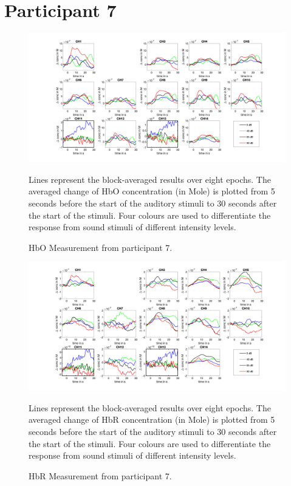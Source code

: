 \section {Participant 7}
\begin{figure}[H]
  \centering
    \includegraphics[scale=.4]{bilder/HbO_Mole/sub_liao_s_HbO.png}
  \caption{HbO Measurement from participant 7.}
  \label{fig:somesignal}
  \medskip
  \footnotesize {Lines represent the block-averaged results over eight epochs. The averaged change of HbO concentration (in Mole) is plotted from 5 seconds before the start of the auditory stimuli to 30 seconds after the start of the stimuli. Four colours are used to differentiate the response from sound stimuli of different intensity levels.}
\end{figure}


\newpage



\begin{figure}[H]
  \centering
    \includegraphics[scale=.4]{bilder/HbR_Mole/sub_liao_s_HbR.png}
  \caption{HbR Measurement from participant 7.}
  \label{fig:somesignal}
  \medskip
  \footnotesize {Lines represent the block-averaged results over eight epochs. The averaged change of HbR concentration (in Mole) is plotted from 5 seconds before the start of the auditory stimuli to 30 seconds after the start of the stimuli. Four colours are used to differentiate the response from sound stimuli of different intensity levels.}
\end{figure}

